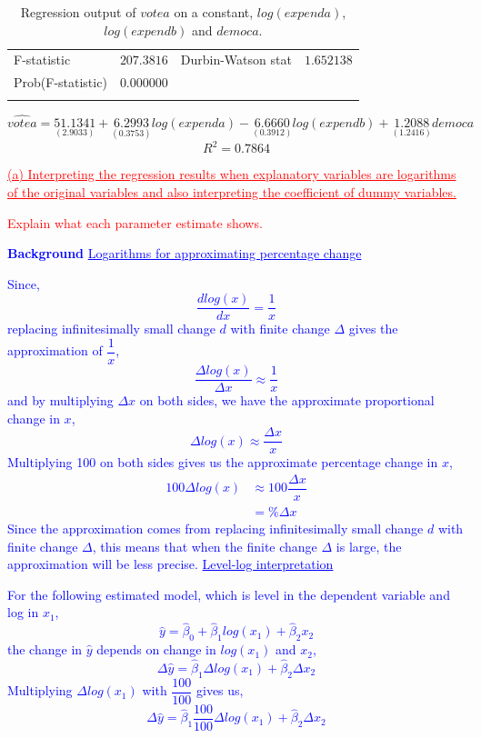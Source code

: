 \documentclass[12pt]{report}
\newenvironment{blueframed}[1][blue]
{\def\FrameCommand{\fboxsep=\FrameSep\fcolorbox{#1}{white}}%
	\MakeFramed {\advance\hsize-\width \FrameRestore}}
{\endMakeFramed}
\begin{document}
\begin{table}[H]
\begin{tabular}{lrrrr}
		\multicolumn{1}{l}{F-statistic}&\multicolumn{1}{r}{$207.3816$}&\multicolumn{2}{l}{Durbin-Watson stat}&\multicolumn{1}{r}{$1.652138$}\\
		\multicolumn{1}{l}{Prob(F-statistic)}&\multicolumn{1}{r}{$0.000000$}&\multicolumn{1}{c}{}&\multicolumn{1}{c}{}&\multicolumn{1}{c}{}\\
		[4.5pt] \hline \\ [-4.5pt]
	\end{tabular}
	\caption{Regression output of $votea$ on a constant, $log(expenda)$, $log(expendb)$ and $democa$.}
\end{table} \vspace{-\baselineskip}
\centering $\widehat{votea} = \underset{(2.9033)}{51.1341} + \underset{(0.3753)}{6.2993}log(expenda) - \underset{(0.3912)}{6.6660}log(expendb) + \underset{(1.2416)}{1.2088}democa$
$$R^2 = 0.7864$$

\newpage
\justify \noindent \textcolor{red}
{
	\uline{(a) Interpreting the regression results when explanatory variables are logarithms of the original variables and also interpreting the coefficient of dummy variables.}
}

\noindent \textcolor{red}
{
	Explain what each parameter estimate shows.
}

\justify
\begin{blueframed}
	\textcolor{blue}{\textbf{Background}}
	\vspace{-\baselineskip}
	\justify
	\textcolor{blue}{\underline{Logarithms for approximating percentage change}}
	
	\noindent \textcolor{blue}
	{
		Since, $$\dfrac{dlog(x)}{dx} = \dfrac{1}{x}$$ replacing infinitesimally small change $d$ with finite change $\Delta$ gives the approximation of $\dfrac{1}{x}$, $$\dfrac{\Delta log(x)}{\Delta x} \approx \dfrac{1}{x}$$ and by multiplying $\Delta x$ on both sides, we have the approximate proportional change in $x$, $$\Delta log(x) \approx \dfrac{\Delta x}{x}$$ Multiplying 100 on both sides gives us the approximate percentage change in $x$, \begin{align*} 
			100\Delta log(x) &\approx 100\dfrac{\Delta x}{x} \\ 
			&= \%\Delta x 
		\end{align*} Since the approximation comes from replacing infinitesimally small change $d$ with finite change $\Delta$, this means that when the finite change $\Delta$ is large, the approximation will be less precise.
	}
	\justify
	\textcolor{blue}{\underline{Level-log interpretation}}
	
	\noindent \textcolor{blue}
	{
		For the following estimated model, which is level in the dependent variable and log in $x_1$, $$\hat{y} = \hat{\beta}_0 + \hat{\beta}_1log(x_1) + \hat{\beta}_2x_2$$ the change in $\hat{y}$ depends on change in $log(x_1)$ and $x_2$, $$\Delta \hat{y} = \hat{\beta}_1\Delta log(x_1) + \hat{\beta}_2\Delta x_2$$ Multiplying $\Delta log(x_1)$ with $\dfrac{100}{100}$ gives us, $$\Delta \hat{y} = \hat{\beta}_1 \dfrac{100}{100}\Delta log(x_1) + \hat{\beta}_2\Delta x_2$$
	}
\end{blueframed}
\end{document}
